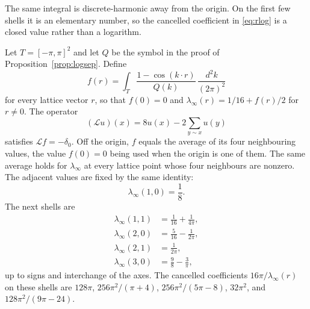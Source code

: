 The same integral is discrete-harmonic away from the origin.
On the first few shells it is an elementary number, so the cancelled
coefficient in \eqref{eq:rlog} is a closed value rather than a logarithm.

\begin{proposition}
\label{prop:mean}
Let \(T=[-\pi,\pi]^2\) and let \(Q\) be the symbol in the proof of
Proposition~\ref{prop:logsep}.
Define
\[
f(r)
=\int_T\frac{1-\cos(k\cdot r)}{Q(k)}\,\frac{d^2k}{(2\pi)^2}
\]
for every lattice vector \(r\), so that \(f(0)=0\) and
\(\lambda_\infty(r)=1/16+f(r)/2\) for \(r\neq 0\).
The operator
\[
(\mathcal{L}u)(x)
=8u(x)-2\sum_{y\sim x}u(y)
\]
satisfies \(\mathcal{L}f=-\delta_0\).
Off the origin, \(f\) equals the average of its four neighbouring values,
the value \(f(0)=0\) being used when the origin is one of them.
The same average holds for \(\lambda_\infty\) at every lattice point whose
four neighbours are nonzero.
The adjacent values are fixed by the same identity:
\[
\lambda_\infty(1,0)=\frac18.
\]
The next shells are
\begin{align*}
\lambda_\infty(1,1)
&=\frac1{16}+\frac1{4\pi},\\
\lambda_\infty(2,0)
&=\frac5{16}-\frac1{2\pi},\\
\lambda_\infty(2,1)
&=\frac1{2\pi},\\
\lambda_\infty(3,0)
&=\frac98-\frac3\pi,
\end{align*}
up to signs and interchange of the axes.
The cancelled coefficients \(16\pi/\lambda_\infty(r)\) on these shells are
\(128\pi\), \(256\pi^2/(\pi+4)\), \(256\pi^2/(5\pi-8)\), \(32\pi^2\), and
\(128\pi^2/(9\pi-24)\).
\end{proposition}

